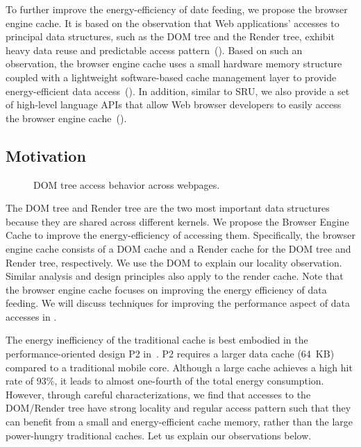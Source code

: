 To further improve the energy-efficiency of date feeding, we propose the browser engine cache. It is based on the observation that Web applications' accesses to principal data structures, such as the DOM tree and the Render tree, exhibit heavy data reuse and predictable access pattern~(). Based on such an observation, the browser engine cache uses a small hardware memory structure coupled with a lightweight software-based cache management layer to provide energy-efficient data access~(). In addition, similar to SRU, we also provide a set of high-level language APIs that allow Web browser developers to easily access the browser engine cache~().

\subsection{Motivation}
\label{sec:cache:motivation}

\begin{figure}[t]
\centering
{}
\hspace*{15pt}
\caption{\small DOM tree access behavior across webpages.}
\label{fig:dom-loc}
\end{figure}

The DOM tree and Render tree are the two most important data structures because they are shared across different kernels. We propose the Browser Engine Cache to improve the energy-efficiency of accessing them. Specifically, the browser engine cache consists of a DOM cache and a Render cache for the DOM tree and Render tree, respectively. We use the DOM to explain our locality observation. Similar analysis and design principles also apply to the render cache. Note that the browser engine cache focuses on improving the energy efficiency of data feeding. We will discuss techniques for improving the performance aspect of data accesses in .

The energy inefficiency of the traditional cache is best embodied in the performance-oriented design P2 in~. P2 requires a larger data cache (64~KB) compared to a traditional mobile core. Although a large cache achieves a high hit rate of 93\%, it leads to almost one-fourth of the total energy consumption. However, through careful characterizations, we find that accesses to the DOM/Render tree have strong locality and regular access pattern such that they can benefit from a small and energy-efficient cache memory, rather than the large power-hungry traditional caches. Let us explain our observations below.

